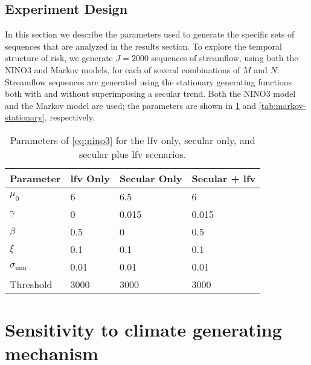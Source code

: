 \documentclass[
]{agujournal2018}
\begin{document}
\subsection{Experiment Design}\label{sec:methods-experiments}

In this section we describe the parameters used to generate the specific sets of sequences that are analyzed in the results section.
To explore the temporal structure of risk, we generate $J=2000$ sequences of streamflow, using both the NINO3 and Markov models, for each of several combinations of $M$ and $N$.
Streamflow sequences are generated using the stationary generating functions both with and without superimposing a secular trend.
Both the NINO3 model and the Markov model are used; the parameters are shown in \cref{tab:nino-stationary} and \cref{tab:markov-stationary}, respectively.

\begin{table}[ht]
  \centering
  \begin{tabular}{llll}
    \toprule
    Parameter & \gls{lfv} Only & Secular Only & Secular + \gls{lfv} \\
    \midrule
    $\mu_0$             & 6     & 6.5   & 6 \\
    $\gamma$            & 0     & 0.015 & 0.015\\
    $\beta$             & 0.5   & 0     & 0.5\\
    $\xi$               & 0.1   & 0.1   & 0.1\\
    $\sigma_\text{min}$ & 0.01  & 0.01  & 0.01\\
    Threshold           & 3000  & 3000  & 3000 \\
    \bottomrule
  \end{tabular}
  \caption{
    Parameters of \cref{eq:nino3} for the \gls{lfv} only, secular only, and secular plus \gls{lfv} scenarios.
  }\label{tab:nino-stationary}
\end{table}

\section{Sensitivity to climate generating mechanism}\label{sec:markov-generating}
\end{document}
